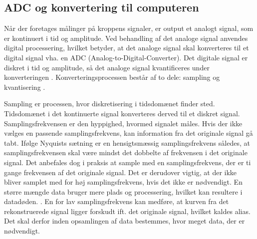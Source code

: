 \subsection{ADC og konvertering til computeren}
Når der foretages målinger på kroppens signaler, er output et analogt signal, som er kontinuert i tid og amplitude. Ved behandling af det analoge signal anvendes digital processering, hvilket betyder, at det analoge signal skal konverteres til et digital signal vha. en ADC (Analog-to-Digital-Converter). Det digitale signal er diskret i tid og amplitude, så det analoge signal kvantificeres under konverteringen \cite{Webster2009}. Konverteringsprocessen består af to dele: sampling og kvantisering \cite{Zouridakis2003}.  

Sampling er processen, hvor diskretisering i tidsdomænet finder sted. Tidsdomænet i det kontinuerte signal konverteres derved til et diskret signal. Samplingsfrekvensen er den hyppighed, hvormed signalet måles. Hvis der ikke vælges en passende samplingsfrekvens, kan information fra det originale signal gå tabt. Ifølge Nyquists sætning er en hensigtsmæssig samplingsfrekvens således, at samplingsfrekvensen skal være mindst det dobbelte af frekvensen i det originale signal. \cite{Zouridakis2003} Det anbefales dog i praksis at sample med en samplingsfrekvens, der er ti gange frekvensen af det originale signal. Det er derudover vigtig, at der ikke bliver samplet med for høj samplingsfrekvens, hvis det ikke er nødvendigt. En større mængde data bruger mere plads og processering, hvilket kan resultere i datadøden. . En for lav samplingsfrekvens kan medføre, at kurven fra det rekonstruerede signal ligger forskudt ift. det originale signal, hvilket kaldes alias. \cite{Zouridakis2003} Det skal derfor inden opsamlingen af data bestemmes, hvor meget data, der er nødvendigt.

